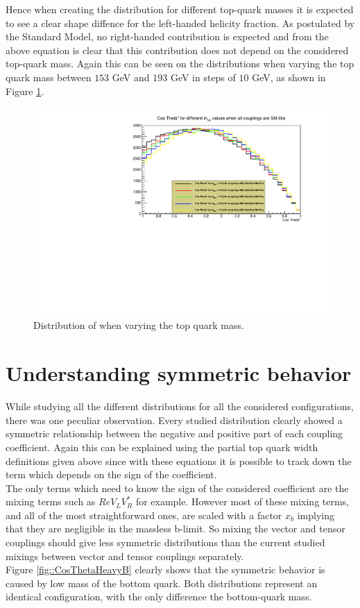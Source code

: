 Hence when creating the \csTh distribution for different top-quark masses it is expected to see a clear shape diffence for the left-handed helicity fraction. As postulated by the Standard Model, no right-handed contribution is expected and from the above equation is clear that this contribution does not depend on the considered top-quark mass. Again this can be seen on the \csTh distributions when varying the top quark mass between $153$ GeV and $193$ GeV in steps of $10$ GeV, as shown in Figure \ref{fig::CosThetaTopMass}.

\begin{figure}[!h]
 \centering
 \includegraphics[width = 0.85 \textwidth]{Afbeeldingen/Chapter_LinkWithTopWidth/CosThetaResults/RVLvsRVR/RVLRVR_CosTheta_CosTheta_TopMassVaried.pdf}
 \caption{Distribution of \csTh when varying the top quark mass.}
 \label{fig::CosThetaTopMass}
\end{figure}

\section{Understanding symmetric behavior}

While studying all the different \csTh distributions for all the considered configurations, there was one peculiar observation. Every studied \csTh distribution clearly showed a symmetric relationship between the negative and positive part of each coupling coefficient. Again this can be explained using the partial top quark width definitions given above since with these equations it is possible to track down the term which depends on the sign of the coefficient.\\
The only terms which need to know the sign of the considered coefficient are the mixing terms such as $Re V_{L} V_{R}^{*}$ for example. However most of these mixing terms, and all of the most straightforward ones, are scaled with a factor $x_{b}$ implying that they are negligible in the massless b-limit. So mixing the vector and tensor couplings should give less symmetric \csTh distributions than the current studied mixings between vector and tensor couplings separately.\\
Figure \ref{fig::CosThetaHeavyB} clearly shows that the symmetric behavior is caused by low mass of the bottom quark. Both distributions represent an identical configuration, with the only difference the bottom-quark mass.

